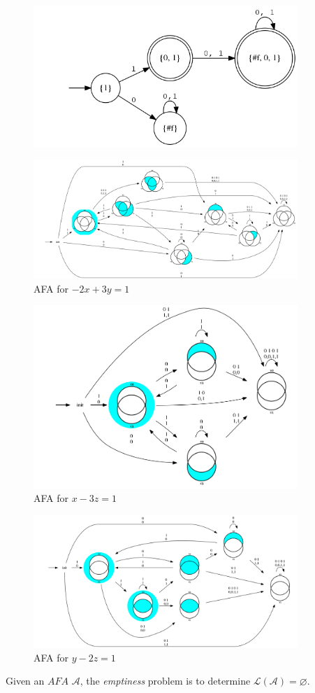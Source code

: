 \begin{example}
\begin{figure}
    \includegraphics[width=10cm]{images/proj_odd_x.png}
  \end{figure}
  \begin{figure}
    \caption{AFA for \( -2 x + 3y = 1 \)}
    \includegraphics[width=10cm]{images/afa_eq5.png}
  \end{figure}
  \begin{figure}
    \caption{AFA for \( x -3z = 1 \)}
    \includegraphics[width=10cm]{images/afa_mod3is1_x.png}
  \end{figure}
  \begin{figure}
    \caption{AFA for \( y -2z = 1 \)}
    \includegraphics[width=10cm]{images/afa_odd_x.png}
  \end{figure}
\end{example}
\iffalse
Given an \( \mathit{AFA}\) \( \mathcal{A} \), the \textit{emptiness} problem is
to determine \( \mathcal{L}(\mathcal{A}) = \varnothing \).

